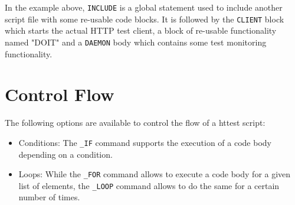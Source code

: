 In the example above, \texttt{INCLUDE} is a global statement used to include another 
script file with some re-usable code blocks. It is followed by the \texttt{CLIENT} 
block which starts the actual HTTP test client, a block of re-usable functionality 
named "DOIT" and a \texttt{DAEMON} body which contains some test monitoring functionality.

\section{Control Flow}

The following options are available to control the flow of a httest script:

\begin{itemize}
\item{Conditions}: The \texttt{\_IF} command supports the execution of a code body 
                   depending on a condition.
\item{Loops}: While the \texttt{\_FOR} command allows to execute a code body for a given
             list of elements, the \texttt{\_LOOP} command allows to do the same for a 
             certain number of times.
\end{itemize}